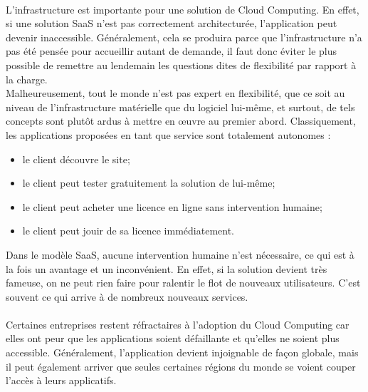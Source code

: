 \documentclass[a4paper,12pt]{report}
\begin{document}
\begin{onehalfspace}
	\paragraph*{}
	L'infrastructure est importante pour une solution de Cloud Computing. En effet, si une solution SaaS n'est pas correctement architecturée, l'application peut devenir inaccessible.	Généralement, cela se produira parce que l'infrastructure n'a pas été pensée pour accueillir autant de demande, il faut donc éviter le plus possible de remettre au lendemain les questions dites de flexibilité par rapport à la charge.\\
	Malheureusement, tout le monde n'est pas expert en flexibilité, que ce soit au niveau de l'infrastructure matérielle que du logiciel lui-même, et surtout, de tels concepts sont plutôt ardus à mettre en œuvre au premier abord. Classiquement, les applications proposées en tant que service sont totalement autonomes :
	\begin{itemize}
\item le client découvre le site;
\item le client peut tester gratuitement la solution de lui-même;
\item le client peut acheter une licence en ligne sans intervention humaine;
\item le client peut jouir de sa licence immédiatement.
	\end{itemize}
	Dans le modèle SaaS, aucune intervention humaine n'est nécessaire, ce qui est à la fois un avantage et un inconvénient. En effet, si la solution devient très fameuse, on ne peut rien faire pour ralentir le flot de nouveaux utilisateurs. C'est souvent ce qui arrive à de nombreux nouveaux services.
	
	\paragraph*{}
	Certaines entreprises restent réfractaires à l'adoption du Cloud Computing car elles ont peur que les applications soient défaillante et qu'elles ne soient plus accessible. Généralement, l'application devient injoignable de façon globale, mais il peut également arriver que seules certaines régions du monde se voient couper l'accès à leurs applicatifs.
	

\end{onehalfspace}
\end{document}
